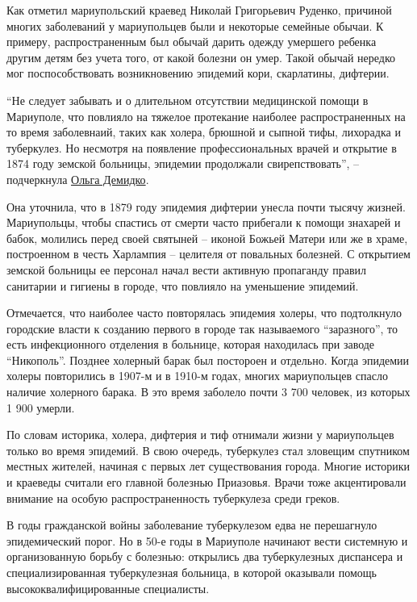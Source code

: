 Как отметил мариупольский краевед Николай Григорьевич Руденко, причиной многих
заболеваний у мариупольцев были и некоторые семейные обычаи. К примеру,
распространенным был обычай дарить одежду умершего ребенка другим детям без
учета того, от какой болезни он умер. Такой обычай нередко мог поспособствовать
возникновению эпидемий кори, скарлатины, дифтерии.

\enquote{Не следует забывать и о длительном отсутствии медицинской помощи в Мариуполе,
что повлияло на тяжелое протекание наиболее распространенных на то время
заболевнаий, таких как холера, брюшной и сыпной тифы, лихорадка и туберкулез.
Но несмотря на появление профессиональных врачей и открытие в 1874 году земской
больницы, эпидемии продолжали свирепствовать}, – подчеркнула \href{\urlDemidkoIA}{Ольга Демидко}.

Она уточнила, что в 1879 году эпидемия дифтерии унесла почти тысячу жизней.
Мариупольцы, чтобы спастись от смерти часто прибегали к  помощи знахарей и
бабок, молились перед своей святыней –  иконой  Божьей Матери или же  в храме,
построенном в честь Харлампия – целителя от повальных болезней. С открытием
земской больницы ее персонал начал вести активную пропаганду правил санитарии и
гигиены в городе, что повлияло на уменьшение эпидемий.

Отмечается, что наиболее часто повторялась эпидемия холеры, что подтолкнуло
городские власти к созданию первого в городе так называемого \enquote{заразного}, то
есть инфекционного отделения в больнице, которая находилась при заводе
\enquote{Никополь}. Позднее холерный барак был постороен и отдельно. Когда эпидемии
холеры повторились в 1907-м и  в 1910-м годах, многих мариупольцев спасло
наличие холерного барака. В это время заболело почти 3 700 человек, из которых
1 900 умерли.

По словам историка, холера, дифтерия и тиф отнимали жизни у мариупольцев только
во время  эпидемий. В свою очередь, туберкулез стал зловещим спутником местных
жителей, начиная с первых лет существования города. Многие историки и краеведы
считали его главной болезнью Приазовья. Врачи тоже акцентировали внимание на
особую распространенность туберкулеза среди греков.

В годы гражданской войны заболевание туберкулезом едва не перешагнуло
эпидемический порог. Но в 50-е годы в Мариуполе начинают вести системную и
организованную борьбу с болезнью: открылись два туберкулезных диспансера и
специализированная туберкулезная больница, в которой оказывали помощь
высококвалифицированные специалисты.

